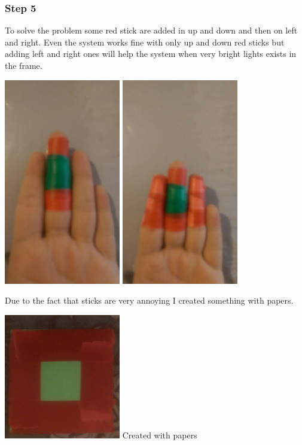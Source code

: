 \documentclass{report}
\begin{document}
\subsubsection{Step 5}
To solve the problem some red stick are added in up and down and then on left and right. Even the system works fine with only  up and down red sticks but adding left and right ones will help the system when very bright lights exists in the frame.
\begin{center}
	\includegraphics[width=2in]{Object4.jpg}
	\includegraphics[width=2in]{Object5.jpg}
\end{center}
Due to the fact that sticks are very annoying I created something with papers.
\begin{center}
	\includegraphics[width=2in]{Object6.jpg} \newline
	\figurename{Created with papers}
\end{center}
\end{document}

